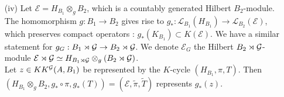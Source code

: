 \begin{dem}
\begin{enumerate}
\item[(iv)] Let $\mathcal E = H_{B_1}\otimes_g B_2$, which is a countably generated Hilbert $B_2$-module. The homomorphism $g:B_1\rightarrow B_2$ gives rise to $g_* : \mathcal L_{B_1}(H_{B_1})\rightarrow \mathcal L_{B_2}(\mathcal E)$, which preserves compact operators : $g_*(K_{B_1})\subset K(\mathcal E)$. We have a similar statement for $g_G : B_1\rtimes\mathcal G\rightarrow B_2\rtimes\mathcal G$. We denote $\mathcal E_G$ the Hilbert $B_2\rtimes\mathcal G$-module $\mathcal E\rtimes\mathcal G\simeq H_{B_1\rtimes \mathcal G}\otimes_g (B_2\rtimes \mathcal G)$.\\

Let $z\in KK^\mathcal G(A,B_1)$ be represented by the $K$-cycle $(H_{B_1},\pi,T)$. Then $(H_{B_1}\otimes_g B_2,g_*\circ\pi, g_*(T))=(\mathcal E, \tilde\pi,\tilde T)$ represents $g_*(z)$.\\


\end{enumerate}
\end{dem}
